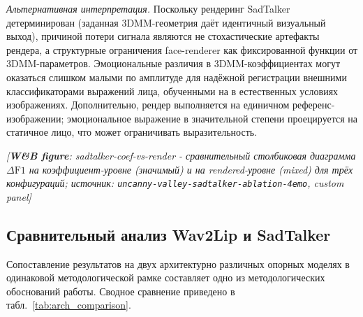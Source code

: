\documentclass[a4paper, 12pt, oneside, openany]{article}
\begin{document}
\textit{Альтернативная интерпретация.} Поскольку рендеринг SadTalker детерминирован (заданная 3DMM-геометрия даёт идентичный визуальный выход), причиной потери сигнала являются не стохастические артефакты рендера, а структурные ограничения face-renderer как фиксированной функции от 3DMM-параметров. Эмоциональные различия в 3DMM-коэффициентах могут оказаться слишком малыми по амплитуде для надёжной регистрации внешними классификаторами выражений лица, обученными на в естественных условиях изображениях. Дополнительно, рендер выполняется на единичном референс-изображении; эмоциональное выражение в значительной степени проецируется на статичное лицо, что может ограничивать выразительность.

\begin{center}
\textit{[\textbf{W\&B figure}: sadtalker-coef-vs-render - сравнительный столбиковая диаграмма $\Delta\mathrm{F1}$ на коэффициент-уровне (значимый) и на rendered-уровне (mixed) для трёх конфигураций; источник: \texttt{uncanny-valley-sadtalker-ablation-4emo}, custom panel]}
\end{center}

\subsection{Сравнительный анализ Wav2Lip и SadTalker}

Сопоставление результатов на двух архитектурно различных опорных моделях в одинаковой методологической рамке составляет одно из методологических обоснований работы. Сводное сравнение приведено в табл.~\ref{tab:arch_comparison}.
\end{document}
